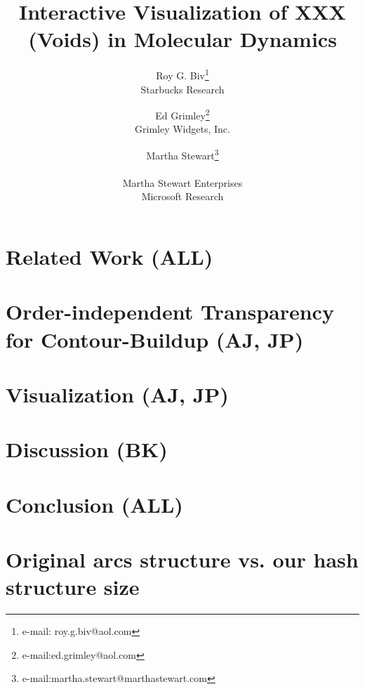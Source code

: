 \documentclass[review]{vgtc}                 %
\title{Interactive Visualization of XXX (Voids) in Molecular Dynamics}
\author{Roy G. Biv\thanks{e-mail: roy.g.biv@aol.com}\\ %
        \scriptsize Starbucks Research %
\and Ed Grimley\thanks{e-mail:ed.grimley@aol.com}\\ %
     \scriptsize Grimley Widgets, Inc. %
\and Martha Stewart\thanks{e-mail:martha.stewart@marthastewart.com}\\ %
     \parbox{1.4in}{\scriptsize \centering Martha Stewart Enterprises \\ Microsoft Research}}
\begin{document}


\maketitle



\section{Related Work (ALL)}


\section{Order-independent Transparency for Contour-Buildup (AJ, JP)}


\section{Visualization (AJ, JP)}


\section{Discussion (BK)}


\section{Conclusion (ALL)}






\appendix
\section{Original arcs structure vs. our hash structure size}

\end{document}
